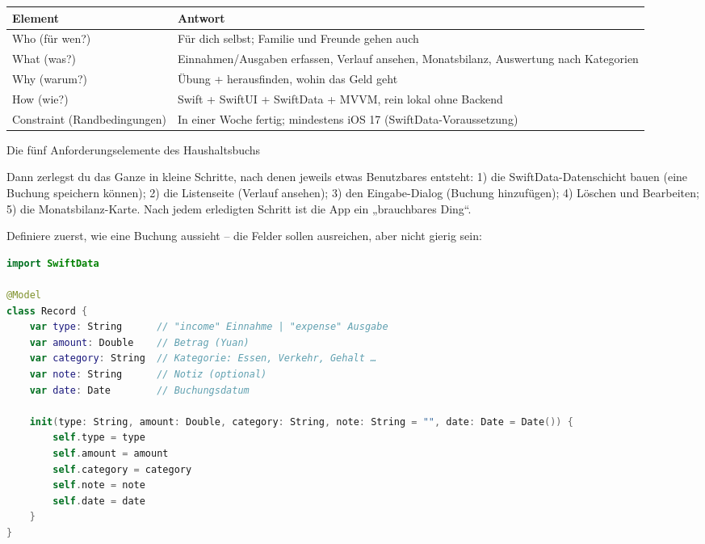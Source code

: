 


\begin{center}
\begin{tabularx}{\linewidth}{|X|X|}
\hline
\textbf{Element} & \textbf{Antwort} \tabularnewline
\hline
Who (für wen?) & Für dich selbst; Familie und Freunde gehen auch \tabularnewline
What (was?) & Einnahmen/Ausgaben erfassen, Verlauf ansehen, Monatsbilanz, Auswertung nach Kategorien \tabularnewline
Why (warum?) & Übung + herausfinden, wohin das Geld geht \tabularnewline
How (wie?) & Swift + SwiftUI + SwiftData + MVVM, rein lokal ohne Backend \tabularnewline
Constraint (Randbedingungen) & In einer Woche fertig; mindestens iOS 17 (SwiftData-Voraussetzung) \tabularnewline
\hline
\end{tabularx}
\end{center}

\begin{center}\small\color{gray}Die fünf Anforderungselemente des Haushaltsbuchs\end{center}

Dann zerlegst du das Ganze in kleine Schritte, nach denen jeweils etwas Benutzbares entsteht: 1) die SwiftData-Datenschicht bauen (eine Buchung speichern können); 2) die Listenseite (Verlauf ansehen); 3) den Eingabe-Dialog (Buchung hinzufügen); 4) Löschen und Bearbeiten; 5) die Monatsbilanz-Karte. Nach jedem erledigten Schritt ist die App ein „brauchbares Ding“.


Definiere zuerst, wie eine Buchung aussieht – die Felder sollen ausreichen, aber nicht gierig sein:

\begin{lstlisting}[language=Swift]
import SwiftData

@Model
class Record {
    var type: String      // "income" Einnahme | "expense" Ausgabe
    var amount: Double    // Betrag (Yuan)
    var category: String  // Kategorie: Essen, Verkehr, Gehalt …
    var note: String      // Notiz (optional)
    var date: Date        // Buchungsdatum

    init(type: String, amount: Double, category: String, note: String = "", date: Date = Date()) {
        self.type = type
        self.amount = amount
        self.category = category
        self.note = note
        self.date = date
    }
}
\end{lstlisting}


